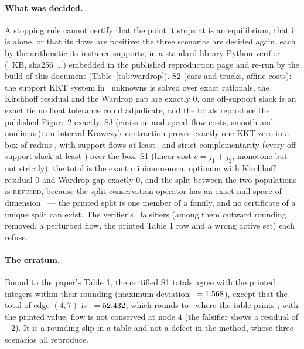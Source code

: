 \documentclass[11pt]{article}
\begin{document}
\paragraph{What was decided.} A stopping rule cannot certify that the point it stops at is an equilibrium, that it is alone, or that its flows are positive; the three scenarios are decided again, each by the arithmetic its instance supports, in a standard-library Python verifier (\WDVerifierKB\ KB, sha256 \WDVerifierSha$\ldots$) embedded in the published reproduction page and re-run by the build of this document (Table~\ref{tab:wardrop}). S2 (cars and trucks, affine costs): the support KKT system in \WDUnknowns\ unknowns is solved over exact rationals, the Kirchhoff residual and the Wardrop gap are exactly $0$, one off-support slack is an exact tie no float tolerance could adjudicate, and the totals reproduce the published Figure 2 exactly. S3 (emission and speed--flow costs, smooth and nonlinear): an interval Krawczyk contraction proves exactly one KKT zero in a box of radius \WDBoxRadius, with support flows at least \WDFlowFloor\ and strict complementarity (every off-support slack at least \WDSlackFloor) over the box. S1 (linear cost $c = j_1 + j_2$, monotone but not strictly): the total is the exact minimum-norm optimum with Kirchhoff residual $0$ and Wardrop gap exactly $0$, and the split between the two populations is \textsc{refused}, because the split-conservation operator has an exact null space of dimension \WDNullDim\ --- the printed split is one member of a family, and no certificate of a unique split can exist. The verifier's \WDReds\ falsifiers (among them outward rounding removed, a perturbed flow, the printed Table 1 row and a wrong active set) each refuse.

\paragraph{The erratum.} Bound to the paper's Table 1, the certified S1 totals agree with the printed integers within their rounding (maximum deviation \WDMaxDevFrac\ $= 1.568$), except that the total of edge $(4, 7)$ is \WDErratumFrac\ $= 52.432$, which rounds to \WDErratumRounds\ where the table prints \WDPrinted; with the printed value, flow is not conserved at node $4$ (the falsifier shows a residual of $+2$). It is a rounding slip in a table and not a defect in the method, whose three scenarios all reproduce.
\end{document}
